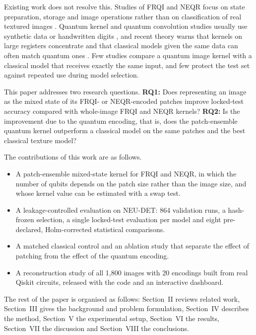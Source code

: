 \documentclass[12pt,onecolumn,draftclsnofoot]{IEEEtran}
\begin{document}
Existing work does not resolve this. Studies of FRQI and NEQR focus on state preparation, storage and image operations rather than on classification of real textured images \cite{le2011frqi,zhang2013neqr,yan2016survey}. Quantum kernel and quantum convolution studies usually use synthetic data or handwritten digits \cite{havlicek2019,henderson2020quanv}, and recent theory warns that kernels on large registers concentrate and that classical models given the same data can often match quantum ones \cite{thanasilp2024,huang2021power}. Few studies compare a quantum image kernel with a classical model that receives exactly the same input, and few protect the test set against repeated use during model selection.

This paper addresses two research questions. \textbf{RQ1:} Does representing an image as the mixed state of its FRQI- or NEQR-encoded patches improve locked-test accuracy compared with whole-image FRQI and NEQR kernels? \textbf{RQ2:} Is the improvement due to the quantum encoding, that is, does the patch-ensemble quantum kernel outperform a classical model on the same patches and the best classical texture model?

The contributions of this work are as follows.
\begin{itemize}
\item A patch-ensemble mixed-state kernel for FRQI and NEQR, in which the number of qubits depends on the patch size rather than the image size, and whose kernel value can be estimated with a swap test.
\item A leakage-controlled evaluation on NEU-DET: 864 validation runs, a hash-frozen selection, a single locked-test evaluation per model and eight pre-declared, Holm-corrected statistical comparisons.
\item A matched classical control and an ablation study that separate the effect of patching from the effect of the quantum encoding.
\item A reconstruction study of all 1,800 images with 20 encodings built from real Qiskit circuits, released with the code and an interactive dashboard.
\end{itemize}

The rest of the paper is organised as follows: Section~II reviews related work, Section~III gives the background and problem formulation, Section~IV describes the method, Section~V the experimental setup, Section~VI the results, Section~VII the discussion and Section~VIII the conclusions.

\end{document}
